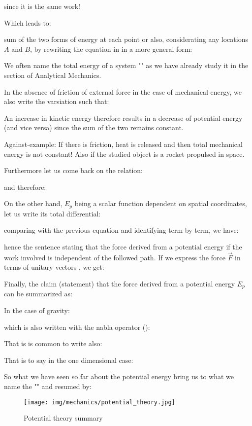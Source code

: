 	since it is the same work!

	Which leads to:
	
	sum of the two forms of energy at each point or also, considerating any locations $A$ and $B$, by rewriting the equation in in a more general form:
	
	\begin{tcolorbox}[title=Remark,colframe=black,arc=10pt]
	We often name the total energy of a system "" as we have already study it in the section of Analytical Mechanics.
	\end{tcolorbox}
	In the absence of friction of external force in the case of mechanical energy, we also write the varsiation such that:
	
	An increase in kinetic energy therefore results in a decrease of potential energy (and vice versa) since the sum of the two remains constant.

	Against-example: If there is friction, heat is released and then total mechanical energy is not constant! Also if the studied object is a rocket propulsed in space.

	Furthermore let us come back on the relation:
	
	and therefore:
	
	On the other hand, $E_p$ being a scalar function dependent on spatial coordinates, let us write its total differential:
	
	comparing with the previous equation and identifying term by term, we have:
	
	hence the sentence stating that the force derived from a potential energy if the work involved is independent of the followed path. If we express the force $\vec{F}$ in terms of unitary vectors , we get:
	
	Finally, the claim (statement) that the force derived from a potential energy $E_p$ can be summarized as:
	
	In the case of gravity:
	
	which is also written with the nabla operator ():
	
	That is is common to write also: 
	
	That is to say in the one dimensional case:
	
	So what we have seen so far about the potential energy bring us to what we name the "" and resumed by:
	\begin{figure}[H]
		\centering
		\texttt{[image: img/mechanics/potential\_theory.jpg]}
		\caption{Potential theory summary}
	\end{figure}
	
